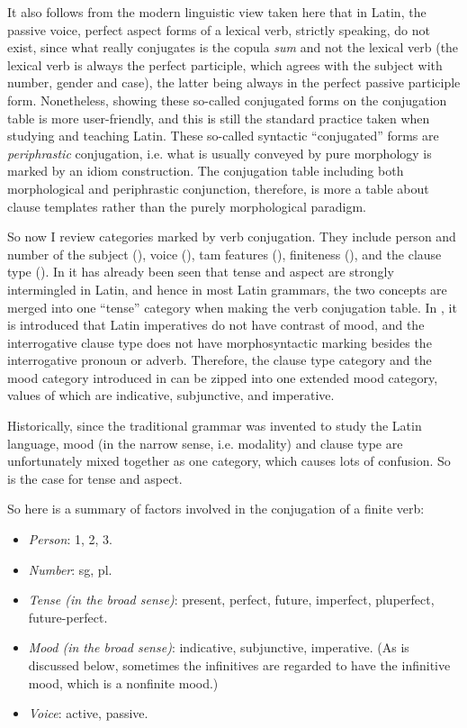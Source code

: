 \documentclass{article}
\newcommand*{\corpus}[1]{\emph{#1}}
\begin{document}
It also follows from the modern linguistic view taken here 
that in Latin, the passive voice, perfect aspect forms of a lexical verb, 
strictly speaking, do not exist, since what really conjugates is the copula \corpus{sum} 
and not the lexical verb 
(the lexical verb is always the perfect participle, which agrees with the subject with number, gender and case),
the latter being always in the perfect passive participle form.
Nonetheless, showing these so-called conjugated forms on the conjugation table 
is more user-friendly, 
and this is still the standard practice taken when studying and teaching Latin.
These so-called syntactic ``conjugated'' forms are \emph{periphrastic} conjugation,
i.e. what is usually conveyed by pure morphology is marked by an idiom construction.  
The conjugation table including both morphological and periphrastic conjunction,
therefore, is more a table about clause templates rather than the purely morphological paradigm.

So now I review categories marked by verb conjugation.
They include person and number of the subject (),
voice (), 
\ac{tam} features (), 
finiteness (), 
and the clause type ().
In  it has already been seen that tense and aspect are strongly intermingled in Latin,
and hence in most Latin grammars, the two concepts are merged into one ``tense'' category 
when making the verb conjugation table.
In , it is introduced that Latin imperatives do not have contrast of mood,
and the interrogative clause type does not have morphosyntactic marking 
besides the interrogative pronoun or adverb.
Therefore, the clause type category and the mood category introduced in  
can be zipped into one extended mood category,
values of which are indicative, subjunctive, and imperative.

Historically, since the traditional grammar was invented to study the Latin language,
mood (in the narrow sense, i.e. modality) and clause type 
are unfortunately mixed together as one category, which causes lots of confusion.
So is the case for tense and aspect.

So here is a summary of factors involved in the conjugation of a finite verb:
\begin{itemize}
    \item \emph{Person}: 1, 2, 3.
    \item \emph{Number}: sg, pl.
    \item \emph{Tense (in the broad sense)}: present, perfect, future, imperfect, pluperfect, future-perfect.
    \item \emph{Mood (in the broad sense)}: indicative, subjunctive, imperative. 
    (As is discussed below, sometimes the infinitives are regarded to have the infinitive mood,
    which is a nonfinite mood.)
    \item \emph{Voice}: active, passive.
\end{itemize}
\end{document}
